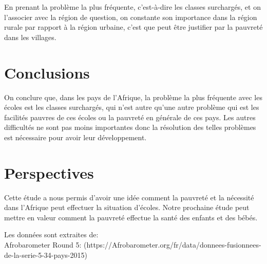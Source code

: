 \documentclass[a0, portrait]{a0poster}
\begin{document}
\begin{multicols}{3}
En prenant la problème la plus fréquente, c'est-à-dire les classes surchargés, et on l'associer avec la région de question, on constante son importance dans la région rurale par rapport à la région urbaine, c'est que peut être justifier par la pauvreté dans les villages.


\color{SaddleBrown} %

\section*{Conclusions}

On conclure que, dans les pays de l'Afrique, la problème la plus fréquente avec les écoles est les classes surchargés, qui n'est autre qu'une autre problème qui est les facilités pauvres de ces écoles ou la pauvreté en générale de ces pays.
Les autres difficultés ne sont pas moins importantes donc la résolution des telles problèmes est nécessaire pour avoir leur développement.

\color{Black} %


\section*{Perspectives}

Cette étude a nous permis d'avoir une idée comment la pauvreté et la nécessité dans l'Afrique peut effectuer la situation d'écoles.
Notre prochaine étude peut mettre en valeur comment la pauvreté effectue la santé des enfants et des bébés.


\nocite{*} %
Les données sont extraites de:\\
Afrobarometer Round 5: (https://Afrobarometer.org/fr/data/donnees-fusionnees-de-la-serie-5-34-pays-2015)


\end{multicols}
\end{document}
